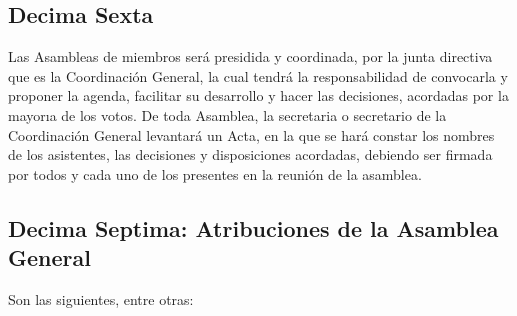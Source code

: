     \subsection{Decima Sexta}
      
      Las Asambleas de miembros ser\'a presidida y coordinada, por la junta
      directiva que es la Coordinaci\'on General, la cual tendr\'a la
      responsabilidad de convocarla y proponer la agenda, facilitar su
      desarrollo y hacer las decisiones, acordadas por la mayor\i{}a de los
      votos. De toda Asamblea, la secretaria o secretario de la Coordinaci\'on
      General levantar\'a un Acta, en la que se har\'a constar los nombres de
      los asistentes, las decisiones y disposiciones acordadas, debiendo ser
      firmada por todos y cada uno de los presentes en la reuni\'on de la
      asamblea.

    \subsection{Decima Septima: Atribuciones de la Asamblea General}

      Son las siguientes, entre otras:

